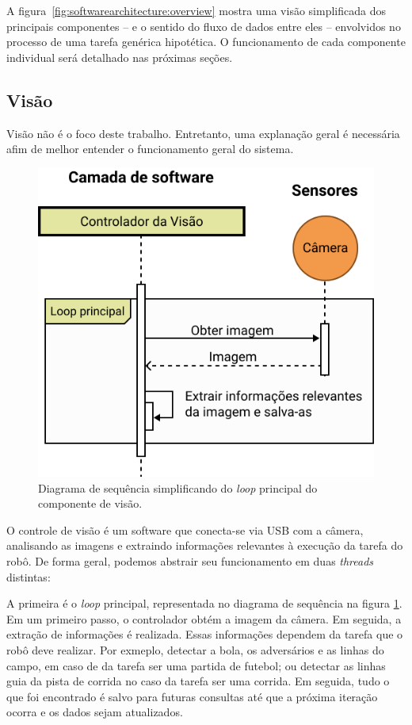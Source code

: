 A figura~\ref{fig:softwarearchitecture:overview} mostra uma visão simplificada dos principais componentes -- e o sentido do fluxo de dados entre eles -- envolvidos no processo de uma tarefa genérica hipotética. O funcionamento de cada componente individual será detalhado nas próximas seções.

\subsection{Visão}

Visão não é o foco deste trabalho. Entretanto, uma explanação geral é necessária afim de melhor entender o funcionamento geral do sistema.

\begin{figure}[h!]
	\centering
	\includegraphics[scale=1]{imagens/svg/softwarearchitecture-vision}
	\caption{Diagrama de sequência simplificando do \textit{loop} principal do componente de visão.}
	\label{fig:softwarearchitecture:vision}
\end{figure}

O controle de visão é um software que conecta-se via USB com a câmera, analisando as imagens e extraindo informações relevantes à execução da tarefa do robô. De forma geral, podemos abstrair seu funcionamento em duas \textit{threads} distintas:

A primeira é o \textit{loop} principal, representada no diagrama de sequência na figura \ref{fig:softwarearchitecture:vision}. Em um primeiro passo, o controlador obtém a imagem da câmera. Em seguida, a extração de informações é realizada. Essas informações dependem da tarefa que o robô deve realizar. Por exmeplo, detectar a bola, os adversários e as linhas do campo, em caso de da tarefa ser uma partida de futebol; ou detectar as linhas guia da pista de corrida no caso da tarefa ser uma corrida. Em seguida, tudo o que foi encontrado é salvo para futuras consultas até que a próxima iteração ocorra e os dados sejam atualizados.

